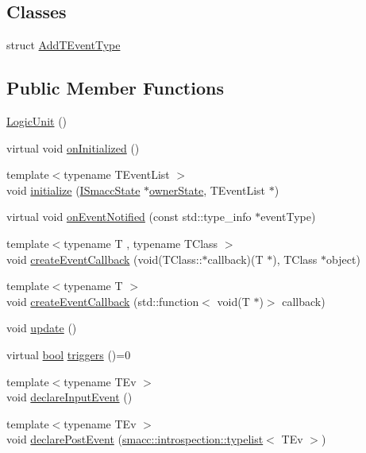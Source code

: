 \subsection*{Classes}
\begin{DoxyCompactItemize}
\item 
struct \hyperlink{structsmacc_1_1LogicUnit_1_1AddTEventType}{Add\+T\+Event\+Type}
\end{DoxyCompactItemize}
\subsection*{Public Member Functions}
\begin{DoxyCompactItemize}
\item 
\hyperlink{classsmacc_1_1LogicUnit_a5c015b00d4c0c3d379cfae8e26a1d474}{Logic\+Unit} ()
\item 
virtual void \hyperlink{classsmacc_1_1LogicUnit_ade7f409516683f13754943db1081bac0}{on\+Initialized} ()
\item 
{\footnotesize template$<$typename T\+Event\+List $>$ }\\void \hyperlink{classsmacc_1_1LogicUnit_ad6abed2fa372c64c7ca7330073ef8c95}{initialize} (\hyperlink{classsmacc_1_1ISmaccState}{I\+Smacc\+State} $\ast$\hyperlink{classsmacc_1_1LogicUnit_a8863d227f46868876632b07b500f27d6}{owner\+State}, T\+Event\+List $\ast$)
\item 
virtual void \hyperlink{classsmacc_1_1LogicUnit_a3a81929b2014b10d0fa28d4bc2d19d9c}{on\+Event\+Notified} (const std\+::type\+\_\+info $\ast$event\+Type)
\item 
{\footnotesize template$<$typename T , typename T\+Class $>$ }\\void \hyperlink{classsmacc_1_1LogicUnit_a58683bd62b8100434dd4a2e4df5382b9}{create\+Event\+Callback} (void(T\+Class\+::$\ast$callback)(T $\ast$), T\+Class $\ast$object)
\item 
{\footnotesize template$<$typename T $>$ }\\void \hyperlink{classsmacc_1_1LogicUnit_a42103eec6907aaa60f297145ba6ca123}{create\+Event\+Callback} (std\+::function$<$ void(T $\ast$)$>$ callback)
\item 
void \hyperlink{classsmacc_1_1LogicUnit_afcec0608a17e039791403472a2411539}{update} ()
\item 
virtual \hyperlink{classbool}{bool} \hyperlink{classsmacc_1_1LogicUnit_ae975a96f0210412e1cb4a7b5b948ade6}{triggers} ()=0
\item 
{\footnotesize template$<$typename T\+Ev $>$ }\\void \hyperlink{classsmacc_1_1LogicUnit_ac2a0394d534063591de8ff8f9ef0bc2c}{declare\+Input\+Event} ()
\item 
{\footnotesize template$<$typename T\+Ev $>$ }\\void \hyperlink{classsmacc_1_1LogicUnit_a4daf7250a0af4cff8703258668efb3e3}{declare\+Post\+Event} (\hyperlink{structsmacc_1_1introspection_1_1typelist}{smacc\+::introspection\+::typelist}$<$ T\+Ev $>$)
\end{DoxyCompactItemize}
